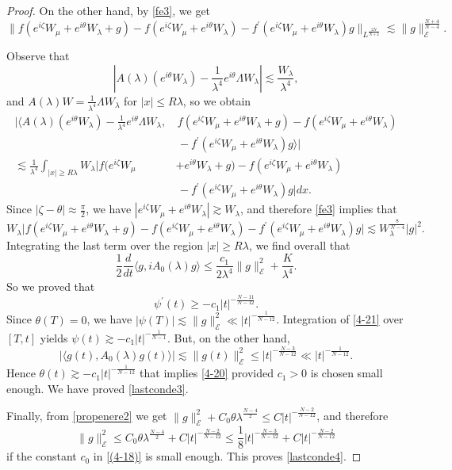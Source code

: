 \documentclass[a4paper,two-side,10pt]{amsart}
\numberwithin{equation}{section}
\begin{document}
\begin{proof}
On the other hand, by \eqref{fe3}, we get
$$\|f(e^{i\zeta}W_\mu +e^{i\theta} W_\lambda +g) - f (e^{i\zeta}W_\mu +e^{i\theta} W_\lambda) - f^\prime (e^{i\zeta} W_\mu +e^{i\theta} W_\lambda) g \|_{L^{\frac{2N}{N+4}}} \lesssim \|g\|_{\mathcal{E}}^{\frac{N+4}{N-4}}. $$

Observe that
$$|A(\lambda)(e^{i\theta} W_\lambda ) - \frac{1}{\lambda^4} e^{i\theta} \Lambda W_\lambda| \lesssim \frac{W_\lambda}{\lambda^4},$$
and $A(\lambda ) W = \frac{1}{\lambda^4} \Lambda W_\lambda$ for $|x|\leq R \lambda$, so we obtain
\begin{align*}
\big|\big\langle A(\lambda) (e^{i\theta }W_\lambda)- \frac{1}{\lambda^4} e^{i\theta}\Lambda W_\lambda,&\, f(e^{i\zeta}W_\mu +e^{i\theta} W_\lambda +g)- f (e^{i\zeta} W_\mu +e^{i\theta} W_\lambda)\\
&\, - f^\prime (e^{i\zeta} W_\mu +e^{i\theta} W_\lambda)g\big\rangle\big|\\
 \lesssim \frac{1}{\lambda^4} \int_{|x|\geq R\lambda} W_\lambda\big|f(e^{i\zeta}W_\mu &+e^{i\theta} W_\lambda +g)- f (e^{i\zeta} W_\mu +e^{i\theta} W_\lambda)\\
&\, - f^\prime (e^{i\zeta} W_\mu +e^{i\theta} W_\lambda)g \big| dx.
\end{align*}
Since $|\zeta -\theta|\approx \frac{\pi}{2} $, we have $|e^{i\zeta}W_\mu + e^{i\theta}W_\lambda | \gtrsim W_\lambda $, and therefore \eqref{fe3} implies that
$$W_\lambda \big|f(e^{i\zeta}W_\mu +e^{i\theta} W_\lambda +g)- f (e^{i\zeta} W_\mu +e^{i\theta} W_\lambda) - f^\prime (e^{i\zeta} W_\mu +e^{i\theta} W_\lambda)g\big| \lesssim W_\lambda^{\frac{8}{N-4}} |g|^2 .$$
Integrating the last term over the region $|x|\geq R\lambda$, we find overall that
$$\frac{1}{2} \dfrac{d}{dt} \langle g ,iA_0 (\lambda ) g \rangle \leq \frac{c_1}{2\lambda^4 } \|g\|_{\mathcal{E}}^2 +\dfrac{K}{\lambda^4}.$$
So we proved that 
\[
\psi^\prime (t) \geq - c_1 |t|^{-\frac{N-11}{N-12}}.
\]
Since $\theta (T)=0 $, we have $|\psi (T)|\lesssim \|g\|_{\mathcal{E}}^2\ll |t|^{-\frac{1}{N-12}} $. Integration of \eqref{4-21} over $[T,t]$ yields $\psi(t) \gtrsim -c_1|t|^{-\frac{1}{N-1}}$. But, on the other hand,
$$|\langle g(t) , A_0 (\lambda ) g(t) \rangle| \lesssim \|g(t)\|_{\mathcal{E}}^2\le |t|^{-\frac{N-3}{N-12}}
\ll |t|^{-\frac{1}{N-12}}.$$
Hence $\theta (t) \gtrsim -c_1|t|^{-\frac{1}{N-12}}$ that implies \eqref{4-20} provided $c_1>0$ is chosen small enough. We have proved \eqref{lastconde3}.

Finally, from \eqref{propenere2} we get
$\|g\|_{\mathcal{E}}^2 +C_0 \theta \lambda^{\frac{N-4}{2}}\le C|t|^{-\frac{N-2}{N-12}}$, and therefore
\[
\|g\|_{\mathcal{E}}^2 \le C_0 \theta \lambda^{\frac{N-4}{2}} +C|t|^{-\frac{N-2}{N-12}}\le \frac{1}{8}|t|^{-\frac{N-3}{N-12}} +C|t|^{-\frac{N-2}{N-12}}
\]
if the constant $c_0$ in \eqref{(4-18)} is small enough.
This proves \eqref{lastconde4}. 
\end{proof}
\end{document}

